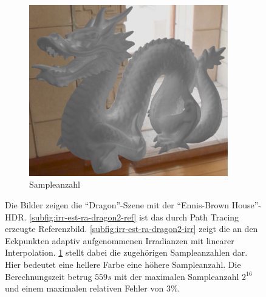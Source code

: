 \begin{figure}[h]
\begin{subfigure}[t]{0.33\textwidth}
			\end{subfigure}
			\begin{subfigure}[t]{0.33\textwidth}
				\center
				\includegraphics[width=0.95\textwidth]{pic/irr_est-ra-dragon2-scount.png}
				\caption{Sampleanzahl}
				\label{subfig:irr-est-ra-dragon2-scount}
			\end{subfigure}
			\caption[Vertex Lighting anhand der \enquote{Dragon}-Szene mit \enquote{Ennis-Brown House}-HDR]{Die Bilder zeigen die \enquote{Dragon}-Szene mit der \enquote{Ennis-Brown House}-HDR. \ref{subfig:irr-est-ra-dragon2-ref} ist das durch Path Tracing erzeugte Referenzbild. \ref{subfig:irr-est-ra-dragon2-irr} zeigt die an den Eckpunkten adaptiv aufgenommenen Irradianzen mit linearer Interpolation. \ref{subfig:irr-est-ra-dragon2-scount} stellt dabei die zugehörigen Sampleanzahlen dar. Hier bedeutet eine hellere Farbe eine höhere Sampleanzahl. Die Berechnungszeit betrug $559\unit{s}$ mit der maximalen Sampleanzahl $2^{16}$ und einem maximalen relativen Fehler von $3\unit{\%}$.}
			\label{fig:irr-est-ra-dragon2}
		\end{figure}

